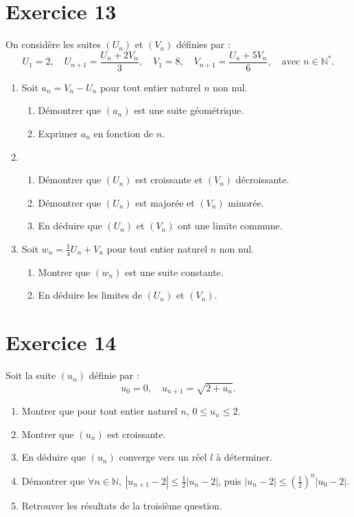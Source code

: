 \documentclass[a4paper,11pt]{article}
\begin{document}
\section*{Exercice 13}

On considère les suites \((U_n)\) et \((V_n)\) définies par :
\[
U_1 = 2, \quad U_{n+1} = \frac{U_n + 2V_n}{3}, \quad
V_1 = 8, \quad V_{n+1} = \frac{U_n + 5V_n}{6}, \quad \text{avec } n \in \mathbb{N}^*.
\]

\begin{enumerate}
    \item Soit \(a_n = V_n - U_n\) pour tout entier naturel \(n\) non nul.
    \begin{enumerate}
        \item Démontrer que \((a_n)\) est une suite géométrique.
        \item Exprimer \(a_n\) en fonction de \(n\).
    \end{enumerate}

    \item 
    \begin{enumerate}
        \item Démontrer que \((U_n)\) est croissante et \((V_n)\) décroissante.
        \item Démontrer que \((U_n)\) est majorée et \((V_n)\) minorée.
        \item En déduire que \((U_n)\) et \((V_n)\) ont une limite commune.
    \end{enumerate}

    \item Soit \(w_n = \frac{1}{4}U_n + V_n\) pour tout entier naturel \(n\) non nul.
    \begin{enumerate}
        \item Montrer que \((w_n)\) est une suite constante.
        \item En déduire les limites de \((U_n)\) et \((V_n)\).
    \end{enumerate}
\end{enumerate}

\section*{Exercice 14}

Soit la suite \((u_n)\) définie par :
\[
u_0 = 0, \quad u_{n+1} = \sqrt{2 + u_n}.
\]

\begin{enumerate}
    \item Montrer que pour tout entier naturel \(n\), \(0 \leq u_n \leq 2\).
    \item Montrer que \((u_n)\) est croissante.
    \item En déduire que \((u_n)\) converge vers un réel \(l\) à déterminer.
    \item Démontrer que \(\forall n \in \mathbb{N}, \ |u_{n+1} - 2| \leq \frac{1}{2} |u_n - 2|\), puis \(|u_n - 2| \leq \left(\frac{1}{2}\right)^n |u_0 - 2|\).
    \item Retrouver les résultats de la troisième question.
\end{enumerate}
\end{document}
